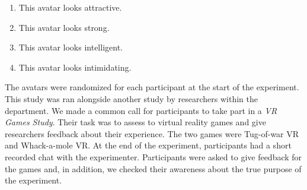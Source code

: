 \begin{enumerate}
\itemsep0em 
\item This avatar looks attractive.
\item This avatar looks strong.
\item This avatar looks intelligent.
\item This avatar looks intimidating.
\end{enumerate}
The avatars were randomized for each participant at the start of the experiment. This study was ran alongside another study by researchers within the department. We made a common call for participants to take part in a \textit{VR Games Study}. Their task was to assess to virtual reality games and give researchers feedback about their experience. The two games were Tug-of-war VR and Whack-a-mole VR. At the end of the experiment, participants had a short recorded chat with the experimenter. Participants were asked to give feedback for the games and, in addition, we checked their awareness about the true purpose of the experiment.

